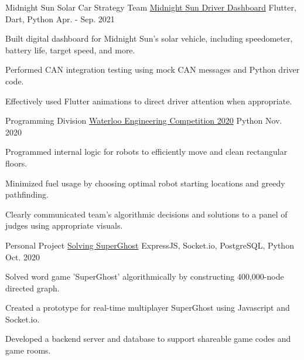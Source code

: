

\begin{cventries}

  \cventry
    {Midnight Sun Solar Car Strategy Team} %
    {\href{https://github.com/uw-midsun/telemetry_xiv}{Midnight Sun Driver Dashboard}} %
    {Flutter, Dart, Python} %
    {Apr. - Sep. 2021} %
    {
      \begin{cvitems} %
        \item {Built digital dashboard for Midnight Sun's solar vehicle, including speedometer, battery life, target speed, and more.}
        \item {Performed CAN integration testing using mock CAN messages and Python driver code.}
        \item {Effectively used Flutter animations to direct driver attention when appropriate.}
      \end{cvitems}
    }

  \cventry
    {Programming Division} %
    {\href{https://github.com/danielq987/WECF2020}{Waterloo Engineering Competition 2020}} %
    {Python} %
    {Nov. 2020} %
    {
      \begin{cvitems} %
        \item {Programmed internal logic for robots to efficiently move and clean rectangular floors.}
        \item {Minimized fuel usage by choosing optimal robot starting locations and greedy pathfinding.}
        \item {Clearly communicated team's algorithmic decisions and solutions to a panel of judges using appropriate visuals.}
      \end{cvitems}
    }

  \cventry
    {Personal Project} %
    {\href{https://github.com/danielq987/superghost-explorer}{Solving SuperGhost}} %
    {ExpressJS, Socket.io, PostgreSQL, Python} %
    {Oct. 2020} %
    {
      \begin{cvitems} %
        \item {Solved word game 'SuperGhost' algorithmically by constructing 400,000-node directed graph.}
        \item {Created a prototype for real-time multiplayer SuperGhost using Javascript and Socket.io.}
        \item {Developed a backend server and database to support shareable game codes and game rooms.}
      \end{cvitems}
    }


\end{cventries}
